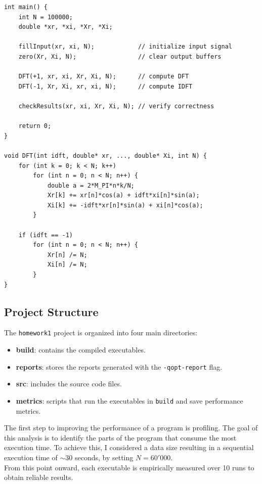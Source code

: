 \begin{lstlisting}[caption={Pseudo code in C}]
int main() {
    int N = 100000;
    double *xr, *xi, *Xr, *Xi;

    fillInput(xr, xi, N);            // initialize input signal
    zero(Xr, Xi, N);                 // clear output buffers

    DFT(+1, xr, xi, Xr, Xi, N);      // compute DFT
    DFT(-1, Xr, Xi, xr, xi, N);      // compute IDFT

    checkResults(xr, xi, Xr, Xi, N); // verify correctness

    return 0;
}

void DFT(int idft, double* xr, ..., double* Xi, int N) {
    for (int k = 0; k < N; k++)
        for (int n = 0; n < N; n++) {
            double a = 2*M_PI*n*k/N;
            Xr[k] += xr[n]*cos(a) + idft*xi[n]*sin(a);
            Xi[k] += -idft*xr[n]*sin(a) + xi[n]*cos(a);
        }

    if (idft == -1)
        for (int n = 0; n < N; n++) {
            Xr[n] /= N;
            Xi[n] /= N;
        }
}
\end{lstlisting}

\subsection{Project Structure}
The \texttt{homework1} project is organized into four main directories:
\begin{itemize}
    \item \textbf{build}: contains the compiled executables.
    \item \textbf{reports}: stores the reports generated with the \texttt{-qopt-report} flag.
    \item \textbf{src}: includes the source code files.
    \item \textbf{metrics}: scripts that run the executables in \texttt{build} and save performance metrics.
\end{itemize}

\noindent
The first step to improving the performance of a program is profiling. The goal of this analysis is to identify the parts of the program that consume the most execution time. To achieve this, I considered a data size resulting in a sequential execution time of $\sim 30$ seconds, by setting $N = 60'000$.\\

\noindent
From this point onward, each executable is empirically measured over 10 runs to obtain reliable results.


